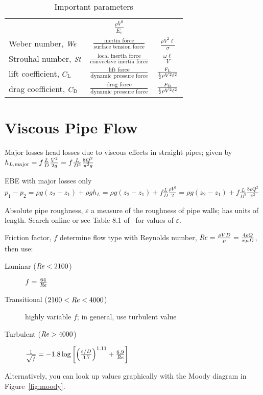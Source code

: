 \documentclass{article}
\begin{document}
\begin{table}
{\begin{tabu}{lcc}
  & \(\frac{\rho{}V^2}{E_v}\) \\
  Weber number, \(\mathord{\mathit{We}}\) & \(\frac{\textrm{inertia force}}{\textrm{surface tension force}}\)
  & \(\frac{\rho{}V^2\ell}{\sigma}\) \\
  Strouhal number, \(\mathord{\mathit{St}}\)
  & \(\frac{\textrm{local inertia force}}{\textrm{convective inertia force}}\)
  & \(\frac{\omega\ell}{V}\) \\
  lift coefficient, \(C_{\mathrm{L}}\) & \(\frac{\textrm{lift force}}{\textrm{dynamic pressure force}}\)
  & \(\frac{F_{\mathrm{L}}}{\frac12\rho{}V^2\ell^2}\) \\
  drag coefficient, \(C_{\mathrm{D}}\) & \(\frac{\textrm{drag force}}{\textrm{dynamic pressure force}}\)
  & \(\frac{F_{\mathrm{D}}}{\frac12\rho{}V^2\ell^2}\) \\
  \bottomrule
  \end{tabu}}
  \caption{Important parameters}\label{tab:params}
\end{table}

\section{Viscous Pipe Flow}

\begin{description*}
\item[Major losses] head losses due to viscous effects in straight pipes; given by
  \(h_{L,\mathrm{major}} = f\frac{L}{D}\frac{V^2}{2g} = f\frac{L}{D^5}\frac{8Q^2}{\pi^2g}\)
\item[EBE with major losses only]
  \(p_1-p_2 = \rho{}g(z_2-z_1)+\rho{}gh_L = \rho{}g(z_2-z_1) + f\frac{L}{D}\frac{\rho{}V^2}{2}
  = \rho{}g(z_2-z_1) + f\frac{L}{D^5}\frac{8\rho{}Q^2}{\pi^2}\)
\item[Absolute pipe roughness, $\varepsilon$] a measure of the roughness of pipe walls; has units of
  length. Search online or see Table 8.1 of~\cite{fofm} for values of $\varepsilon$.
\item[Friction factor, $f$] determine flow type with Reynolds number,
  \(\mathord{\mathit{Re}} = \frac{\rho{}VD}{\mu} = \frac{4\rho{}Q}{\pi\mu{}D}\), then use:
  \begin{description}
  \item[Laminar (\(\mathord{\mathit{Re}}<2100\))]
    \(f = \frac{64}{\mathord{\mathit{Re}}}\)
  \item[Transitional (\(2100<\mathord{\mathit{Re}}<4000\))]
    highly variable $f$; in general, use turbulent value
  \item[Turbulent (\(\mathord{\mathit{Re}}>4000\))]
    \(\frac{1}{\sqrt{f}}
    = -1.8\log\left[{\left(\frac{\varepsilon/D}{3.7}\right)}^{1.11}
      + \frac{6.9}{\mathord{\mathit{Re}}}\right]\)
  \end{description}
  Alternatively, you can look up values graphically with the Moody diagram in Figure~\ref{fig:moody}.
\end{description*}
\end{document}
